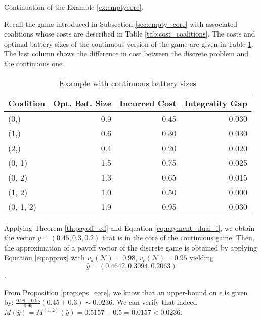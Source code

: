 \documentclass[sigconf, table]{acmart}
\newcommand{\N}{\mathcal{N}}
\begin{document}
\begin{example} Continuation of the Example \ref{ex:emptycore}.

Recall the game introduced in Subsection \ref{sec:empty_core} with associated coalitions whose costs are described in Table \ref{tab:cost_coalitions}. The costs and optimal battery sizes of the continuous version of the game are given in Table \ref{tab:cost_coal_cont}. The last column shows the difference in cost between the discrete problem and the continuous one.

\begin{table}
  \caption{Example with continuous battery sizes}
  \label{tab:cost_coal_cont}
\begin{tabular}{lrrr}
\toprule
 Coalition &  Opt. Bat. Size &  Incurred Cost &  Integrality Gap \\
\midrule
      (0,) &                   0.9 &           0.45 &            0.030 \\
      (1,) &                   0.6 &           0.30 &            0.030 \\
      (2,) &                   0.4 &           0.20 &            0.020 \\
    (0, 1) &                   1.5 &           0.75 &            0.025 \\
    (0, 2) &                   1.3 &           0.65 &            0.015 \\
    (1, 2) &                   1.0 &           0.50 &            0.000 \\
 (0, 1, 2) &                   1.9 &           0.95 &            0.030 \\
\bottomrule
\end{tabular}
\end{table}

Applying Theorem \ref{th:payoff_cd} and Equation \eqref{eq:payment_dual_i}, we obtain the vector $y = (0.45, 0.3, 0.2)$ that is in the core of the continuous game. Then, the approximation of a payoff vector of the discrete game is obtained by applying Equation \eqref{eq:approx} with $v_d(\N) = 0.98$, $v_c(\N) = 0.95$ yielding $$\hat{y} = (0.4642, 0.3094, 0.2063)$$.

From Proposition \ref{prop:eps_core}, we know that an upper-bound on $\epsilon$ is given by: $\frac{0.98 - 0.95}{0.95} \left( 0.45 + 0.3 \right) \sim 0.0236$. We can verify that indeed $M(\hat{y}) = M^{(1, 2)}(\hat{y}) = 0.5157 - 0.5 =  0.0157 < 0.0236$.


\end{example}
\end{document}
